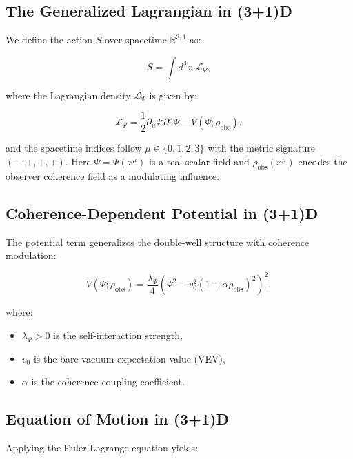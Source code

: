 \documentclass{report}
\begin{document}
\subsection{The Generalized Lagrangian in (3+1)D}

We define the action $S$ over spacetime $\mathbb{R}^{3,1}$ as:

\begin{equation}
S = \int d^4x \; \mathcal{L}_\Psi,
\end{equation}

where the Lagrangian density $\mathcal{L}_\Psi$ is given by:

\begin{equation}
\mathcal{L}_\Psi = \frac{1}{2} \partial_\mu \Psi \, \partial^\mu \Psi - V(\Psi; \rho_{\text{obs}}),
\end{equation}

and the spacetime indices follow $\mu \in \{0,1,2,3\}$ with the metric signature $(-,+,+,+)$. Here $\Psi = \Psi(x^\mu)$ is a real scalar field and $\rho_{\text{obs}}(x^\mu)$ encodes the observer coherence field as a modulating influence.

\subsection{Coherence-Dependent Potential in (3+1)D}

The potential term generalizes the double-well structure with coherence modulation:

\begin{equation}
V(\Psi; \rho_{\text{obs}}) = \frac{\lambda_\Psi}{4} \left(\Psi^2 - v_0^2(1 + \alpha \rho_{\text{obs}})^2\right)^2,
\end{equation}

where:
\begin{itemize}
  \item $\lambda_\Psi > 0$ is the self-interaction strength,
  \item $v_0$ is the bare vacuum expectation value (VEV),
  \item $\alpha$ is the coherence coupling coefficient.
\end{itemize}

\subsection{Equation of Motion in (3+1)D}

Applying the Euler-Lagrange equation yields:
\end{document}
